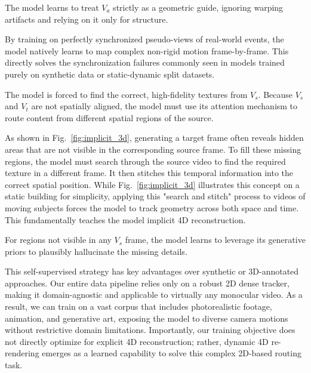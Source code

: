 \begin{description}[noitemsep, topsep=0pt, partopsep=0pt, leftmargin=0pt, style=unboxed, font=\normalfont\bfseries]
    \item[Ignoring Anchor Artifacts] The model learns to treat $V_{a}$ strictly as a geometric guide, ignoring warping artifacts and relying on it only for structure.
    \item[Temporal Synchronization of Dynamics] By training on perfectly synchronized pseudo-views of real-world events, the model natively learns to map complex non-rigid motion frame-by-frame. This directly solves the synchronization failures commonly seen in models trained purely on synthetic data or static-dynamic split datasets.
    \item[Spatial Content Sourcing] The model is forced to find the correct, high-fidelity textures from $V_{s}$. Because $V_{s}$ and $V_{t}$ are not spatially aligned, the model must use its attention mechanism to route content from different spatial regions of the source.
    \item[Implicit 4D Reconstruction] As shown in Fig.~\ref{fig:implicit_3d}, generating a target frame often reveals hidden areas that are not visible in the corresponding source frame. To fill these missing regions, the model must search through the source video to find the required texture in a different frame. It then stitches this temporal information into the correct spatial position. While Fig.~\ref{fig:implicit_3d} illustrates this concept on a static building for simplicity, applying this "search and stitch" process to videos of moving subjects forces the model to track geometry across both space and time. This fundamentally teaches the model implicit 4D reconstruction.
    \item[Generative In-painting] For regions not visible in any $V_{s}$ frame, the model learns to leverage its generative priors to plausibly hallucinate the missing details.
\end{description}

This self-supervised strategy has key advantages over synthetic or 3D-annotated approaches. Our entire data pipeline relies only on a robust 2D dense tracker, making it domain-agnostic and applicable to virtually any monocular video. As a result, we can train on a vast corpus that includes photorealistic footage, animation, and generative art, exposing the model to diverse camera motions without restrictive domain limitations. Importantly, our training objective does not directly optimize for explicit 4D reconstruction; rather, dynamic 4D re-rendering emerges as a learned capability to solve this complex 2D-based routing task.



